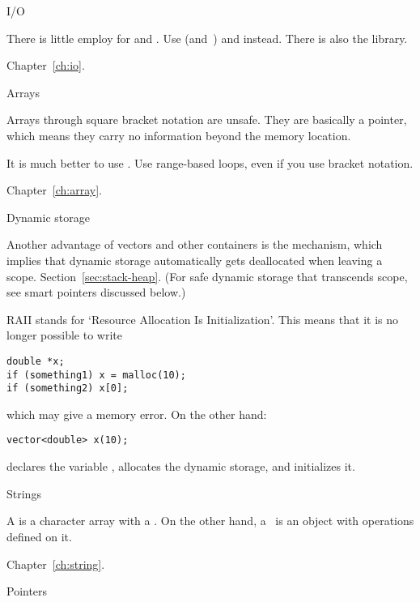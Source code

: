 
 {I/O}

There is little employ for  and
. Use  (and~)
and  instead. There is also the  library.

Chapter~\ref{ch:io}.

 {Arrays}

Arrays through square bracket notation are unsafe. They are basically
a pointer, which means they carry no information beyond the memory location.

It is much better
to use . Use range-based loops, even if you use
bracket notation.

Chapter~\ref{ch:array}.

 {Dynamic storage}

Another advantage of vectors and other containers is the 
mechanism, which implies that dynamic storage automatically gets
deallocated when leaving a scope. Section~\ref{sec:stack-heap}. (For
safe dynamic storage that transcends scope, see smart pointers
discussed below.)

RAII stands for `Resource Allocation Is Initialization'. This means
that it is no longer possible to write
\begin{verbatim}
double *x;
if (something1) x = malloc(10);
if (something2) x[0];
\end{verbatim}
which may give a memory error. On the other hand:
\begin{lstlisting}
vector<double> x(10);
\end{lstlisting}
declares the variable , allocates the dynamic storage, and
initializes it.

 {Strings}

A  is a character array with a . On the other hand, a~ is an object
with operations defined on it.

Chapter~\ref{ch:string}.

 {Pointers}


